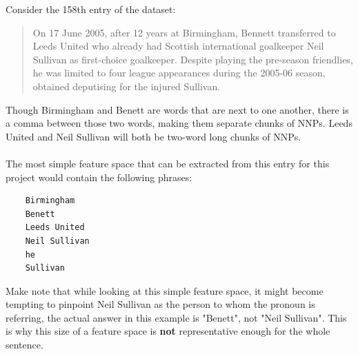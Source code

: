 \documentclass{article}
\begin{document}
Consider the 158th entry of the dataset:
\begin{quote}
    On 17 June 2005, after 12 years at Birmingham, Bennett transferred to Leeds United who already had Scottish international goalkeeper Neil Sullivan as first-choice goalkeeper. Despite playing the pre-season friendlies, he was limited to four league appearances during the 2005-06 season, obtained deputising for the injured Sullivan.
\end{quote}
Though Birmingham and Benett are words that are next to one another, there is a comma between those two words, making them separate chunks of NNPs. Leeds United and Neil Sullivan will both be two-word long chunks of NNPs. \\ \\
The most simple feature space that can be extracted from this entry for this project would contain the following phrases:
\begin{verbatim}
    Birmingham
    Benett
    Leeds United
    Neil Sullivan
    he
    Sullivan
\end{verbatim}
Make note that while looking at this simple feature space, it might become tempting to pinpoint Neil Sullivan as the person to whom the pronoun is referring, the actual answer in this example is "Benett", not "Neil Sullivan". This is why this size of a feature space is \textbf{not} representative enough for the whole sentence.\\ \\
\end{document}
